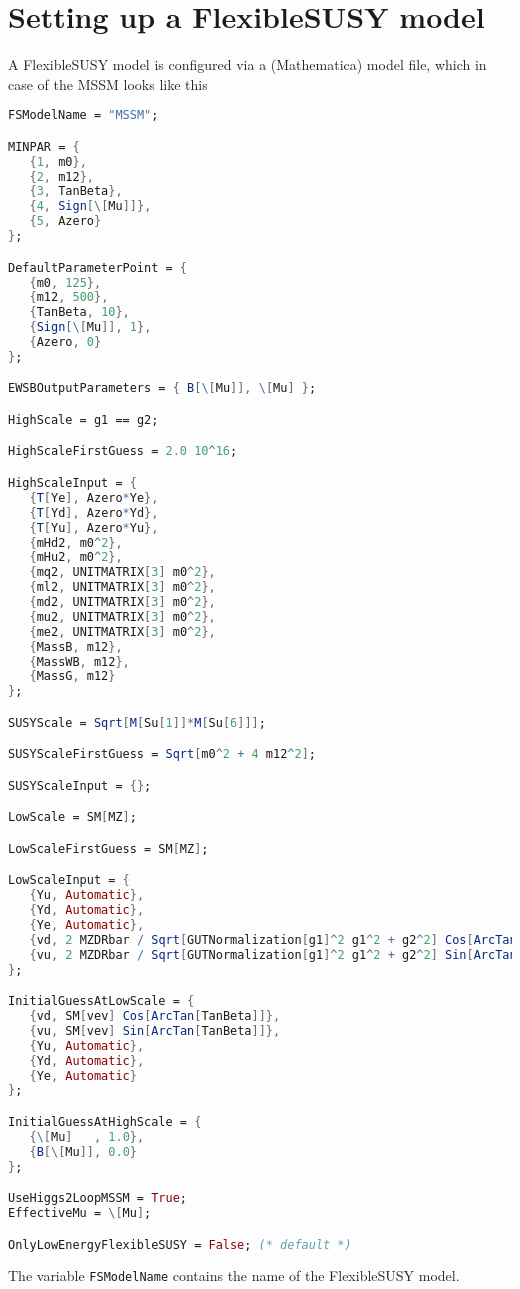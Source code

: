 \documentclass[final,3p,times,pdflatex]{elsarticle}
\newcommand{\fs}{FlexibleSUSY\xspace}
\newcommand{\code}[1]{\lstinline|#1|}  %
\begin{document}
\section{Setting up a FlexibleSUSY model}
\label{Sec:modfile}
A \fs model is configured via a (Mathematica) model file, which in
case of the MSSM looks like this
%
\begin{lstlisting}[language=Mathematica]
FSModelName = "MSSM";

MINPAR = {
   {1, m0},
   {2, m12},
   {3, TanBeta},
   {4, Sign[\[Mu]]},
   {5, Azero}
};

DefaultParameterPoint = {
   {m0, 125},
   {m12, 500},
   {TanBeta, 10},
   {Sign[\[Mu]], 1},
   {Azero, 0}
};

EWSBOutputParameters = { B[\[Mu]], \[Mu] };

HighScale = g1 == g2;

HighScaleFirstGuess = 2.0 10^16;

HighScaleInput = {
   {T[Ye], Azero*Ye},
   {T[Yd], Azero*Yd},
   {T[Yu], Azero*Yu},
   {mHd2, m0^2},
   {mHu2, m0^2},
   {mq2, UNITMATRIX[3] m0^2},
   {ml2, UNITMATRIX[3] m0^2},
   {md2, UNITMATRIX[3] m0^2},
   {mu2, UNITMATRIX[3] m0^2},
   {me2, UNITMATRIX[3] m0^2},
   {MassB, m12},
   {MassWB, m12},
   {MassG, m12}
};

SUSYScale = Sqrt[M[Su[1]]*M[Su[6]]];

SUSYScaleFirstGuess = Sqrt[m0^2 + 4 m12^2];

SUSYScaleInput = {};

LowScale = SM[MZ];

LowScaleFirstGuess = SM[MZ];

LowScaleInput = {
   {Yu, Automatic},
   {Yd, Automatic},
   {Ye, Automatic},
   {vd, 2 MZDRbar / Sqrt[GUTNormalization[g1]^2 g1^2 + g2^2] Cos[ArcTan[TanBeta]]},
   {vu, 2 MZDRbar / Sqrt[GUTNormalization[g1]^2 g1^2 + g2^2] Sin[ArcTan[TanBeta]]}
};

InitialGuessAtLowScale = {
   {vd, SM[vev] Cos[ArcTan[TanBeta]]},
   {vu, SM[vev] Sin[ArcTan[TanBeta]]},
   {Yu, Automatic},
   {Yd, Automatic},
   {Ye, Automatic}
};

InitialGuessAtHighScale = {
   {\[Mu]   , 1.0},
   {B[\[Mu]], 0.0}
};

UseHiggs2LoopMSSM = True;
EffectiveMu = \[Mu];

OnlyLowEnergyFlexibleSUSY = False; (* default *)
\end{lstlisting}
%
The variable \code{FSModelName} contains the name of the \fs model.
\end{document}
